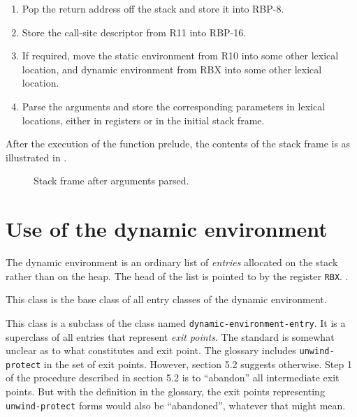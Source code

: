 \begin{enumerate}
\item Pop the return address off the stack and store it into RBP-8.
\item Store the call-site descriptor from R11 into RBP-16.
\item If required, move the static environment from R10 into some
  other lexical location, and dynamic environment from RBX into some
  other lexical location.
\item Parse the arguments and store the corresponding parameters in
  lexical locations, either in registers or in the initial stack
  frame.
\end{enumerate}

After the execution of the function prelude, the contents of the stack
frame is as illustrated in
.

\begin{figure}
\begin{center}
\end{center}
\caption{\label{fig-x86-64-alternative-stack-frame-after-arguments-parsed}
Stack frame after arguments parsed.}
\end{figure}

\section{Use of the dynamic environment}

The dynamic environment is an ordinary list of \emph{entries}
allocated on the stack rather than on the heap.  The head of the list
is pointed to by the register \texttt{RBX}.
.


This class is the base class of all entry classes of the dynamic
environment.


This class is a subclass of the class named
\texttt{dynamic-environment-entry}.  It is a superclass of all entries
that represent \emph{exit points}.  The \commonlisp{} standard is
somewhat unclear as to what constitutes and exit point.  The glossary
includes \texttt{unwind-protect} in the set of exit points.  However,
section 5.2 suggests otherwise.  Step 1 of the procedure described in
section 5.2 is to ``abandon'' all intermediate exit points.  But with
the definition in the glossary, the exit points representing
\texttt{unwind-protect} forms would also be ``abandoned'', whatever
that might mean.

